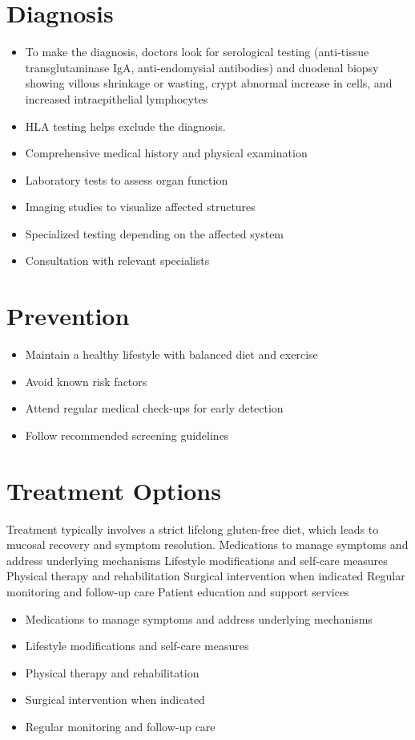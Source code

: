 \section{Diagnosis}
\begin{itemize}[noitemsep]
  \item To make the diagnosis, doctors look for serological testing (anti-tissue transglutaminase IgA, anti-endomysial antibodies) and duodenal biopsy showing villous shrinkage or wasting, crypt abnormal increase in cells, and increased intraepithelial lymphocytes
  \item HLA testing helps exclude the diagnosis.
  \item Comprehensive medical history and physical examination
  \item Laboratory tests to assess organ function
  \item Imaging studies to visualize affected structures
  \item Specialized testing depending on the affected system
  \item Consultation with relevant specialists
\end{itemize}
\section{Prevention}
\begin{itemize}[noitemsep]
  \item Maintain a healthy lifestyle with balanced diet and exercise
  \item Avoid known risk factors
  \item Attend regular medical check-ups for early detection
  \item Follow recommended screening guidelines
\end{itemize}
\section{Treatment Options}
Treatment typically involves a strict lifelong gluten-free diet, which leads to mucosal recovery and symptom resolution. Medications to manage symptoms and address underlying mechanisms Lifestyle modifications and self-care measures Physical therapy and rehabilitation Surgical intervention when indicated Regular monitoring and follow-up care Patient education and support services

\begin{itemize}[noitemsep]
  \item Medications to manage symptoms and address underlying mechanisms
  \item Lifestyle modifications and self-care measures
  \item Physical therapy and rehabilitation
  \item Surgical intervention when indicated
  \item Regular monitoring and follow-up care
\end{itemize}
